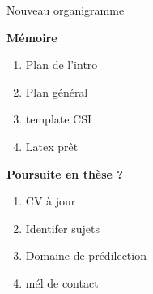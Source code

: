 \documentclass[A4,svgnames,9pt,aspectratio=169]{beamer}
\begin{document}
\begin{frame}{Nouveau organigramme}
\begin{center}
    \begin{minipage}[t]{0.45\textwidth}
      \textbf{Mémoire}
      \begin{enumerate}
        \item Plan de l'intro
        \item Plan général
        \item template CSI
        \item Latex prêt
      \end{enumerate}
    \end{minipage}
    \hfill 
    \begin{minipage}[t]{0.45\textwidth}
      \textbf{Poursuite en thèse ?}
      \begin{enumerate}
        \item CV à jour
        \item Identifer sujets
        \item Domaine de prédilection
        \item mél de contact
      \end{enumerate}
    \end{minipage}
    \end{center}

\end{frame}

\end{document}
